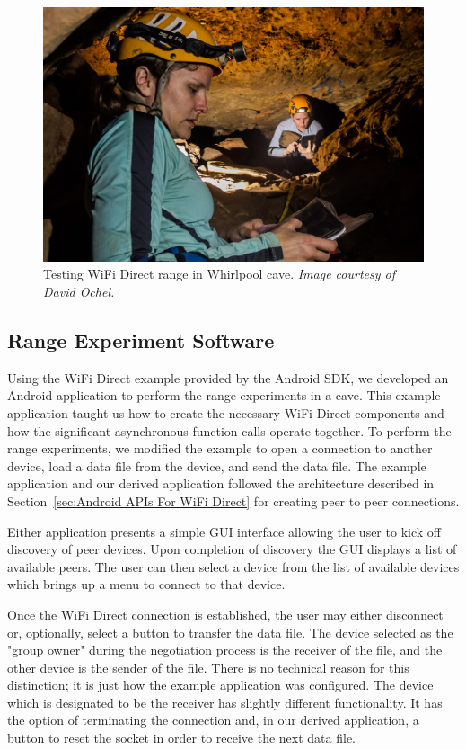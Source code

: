 \documentclass[10pt,twocolumn]{article}
\begin{document}
\begin{figure}
\includegraphics[width=\columnwidth]{cavewifi}
\caption{Testing WiFi Direct range in Whirlpool cave. \textit{Image courtesy of David Ochel.}}
\end{figure}


\subsection{Range Experiment Software}
\label{sec:Range Experiment Software}
Using the WiFi Direct example provided by the Android SDK, 
we developed an Android application to perform the range experiments in a cave.
This example application taught us how to create the necessary WiFi Direct components and how the significant asynchronous function calls operate together.
To perform the range experiments, we modified the example to open a connection to another device, load a data file from the device, and send the data file. 
The example application and our derived application followed the architecture described in Section~\ref{sec:Android APIs For WiFi Direct} for creating peer to peer connections. 

Either application presents a simple GUI interface allowing the user to kick off discovery of peer devices. 
Upon completion of discovery the GUI displays a list of available peers.
The user can then select a device from the list of available devices which brings up a menu to connect to that device.

Once the WiFi Direct connection is established, the user may either disconnect or, optionally, select a button to transfer the data file.
The device selected as the "group owner" during the negotiation process is the receiver of the file, and the other device is the sender of the file.
There is no technical reason for this distinction; it is just how the example application was configured.
The device which is designated to be the receiver has slightly different functionality.
It has the option of terminating the connection and, in our derived application, a button to reset the socket in order to receive the next data file.
\end{document}
